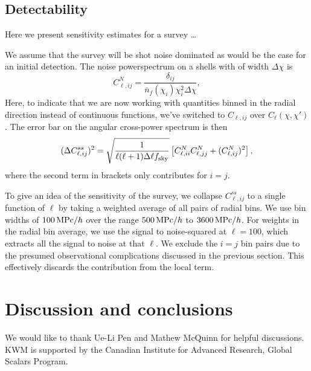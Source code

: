 \documentclass[twocolumn,prl,nofootinbib]{revtex4-1}
\begin{document}
\subsection{Detectability}

Here we present sensitivity estimates for a survey \ldots

We assume that the survey will be shot noise dominated as would be the case for
an initial detection.  The noise powerspectrum on a shells with of width
$\Delta \chi$ is
\begin{equation}
    C^N_{\ell, ij} = \frac{\delta_{ij}}{\bar n_f(\chi_i)\chi_i^2\Delta\chi},
\end{equation}
Here, to indicate that we are now working with quantities binned in the radial
direction instead of
continuous functions, we've switched to $C_{\ell,ij}$ over 
$C_\ell(\chi, \chi')$. The error bar on the angular
cross-power spectrum is then
\begin{align}
    (\Delta{C^{ss}_{\ell,ij}})^2 = 
    \sqrt{\frac{1}{\ell(\ell + 1)\Delta \ell f_{\rm sky}}}
        \left[C^N_{\ell,ii} C^N_{\ell,jj} +  (C^N_{\ell,ij})^2\right],
\end{align}
where the second term in brackets only contributes for $i = j$.

To give an idea of the sensitivity of the survey, we collapse
$C^{ss}_{\ell,ij}$ to a single function of $\ell$ by taking a weighted average
of all pairs of radial bins. We use bin widths of $100\,{\rm MPc}/h$ over the
range $500\,{\rm MPc}/h$ to $3600\,{\rm MPc}/h$.
For weights in the radial bin average, we use the signal to noise-squared
at $\ell=100$, which extracts all the signal to noise at that $\ell$.
We exclude the $i = j$ bin pairs due to
the presumed observational complications discussed in the previous section.
This effectively discards the contribution from the local term.

\section{Discussion and conclusions}


\begin{acknowledgments}

We would like to thank Ue-Li Pen and Mathew McQuinn for helpful discussions.
%
KWM is supported by the Canadian Institute for Advanced Research, Global Scalars
Program.

\end{acknowledgments}
\end{document}
